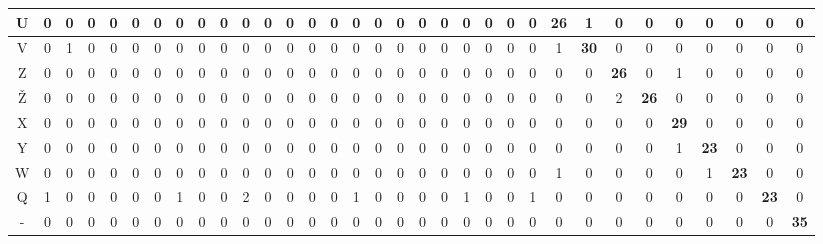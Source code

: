 \begin{table}[]
{\begin{tabular}{|c|c|c|c|c|c|c|c|c|c|c|c|c|c|c|c|c|c|c|c|c|c|c|c|c|c|c|c|c|c|c|c|c|}
U & 0 & 0 & 0 & 0 & 0 & 0 & 0 & 0 & 0 & 0 & 0 & 0 & 0 & 0 & 0 & 0 & 0 & 0 & 0 & 0 & 0 & 0 & 0 & \textbf{26} & 1 & 0 & 0 & 0 & 0 & 0 & 0 & 0 \\ \hline \rowcolor{gray1}
V & 0 & 1 & 0 & 0 & 0 & 0 & 0 & 0 & 0 & 0 & 0 & 0 & 0 & 0 & 0 & 0 & 0 & 0 & 0 & 0 & 0 & 0 & 0 & 1 & \textbf{30} & 0 & 0 & 0 & 0 & 0 & 0 & 0 \\ \hline \rowcolor{gray2} 
Z & 0 & 0 & 0 & 0 & 0 & 0 & 0 & 0 & 0 & 0 & 0 & 0 & 0 & 0 & 0 & 0 & 0 & 0 & 0 & 0 & 0 & 0 & 0 & 0 & 0 & \textbf{26} & 0 & 1 & 0 & 0 & 0 & 0 \\ \hline \rowcolor{gray1}
Ž & 0 & 0 & 0 & 0 & 0 & 0 & 0 & 0 & 0 & 0 & 0 & 0 & 0 & 0 & 0 & 0 & 0 & 0 & 0 & 0 & 0 & 0 & 0 & 0 & 0 & 2 & \textbf{26} & 0 & 0 & 0 & 0 & 0 \\ \hline \rowcolor{gray2} 
X & 0 & 0 & 0 & 0 & 0 & 0 & 0 & 0 & 0 & 0 & 0 & 0 & 0 & 0 & 0 & 0 & 0 & 0 & 0 & 0 & 0 & 0 & 0 & 0 & 0 & 0 & 0 & \textbf{29} & 0 & 0 & 0 & 0 \\ \hline \rowcolor{gray1}
Y & 0 & 0 & 0 & 0 & 0 & 0 & 0 & 0 & 0 & 0 & 0 & 0 & 0 & 0 & 0 & 0 & 0 & 0 & 0 & 0 & 0 & 0 & 0 & 0 & 0 & 0 & 0 & 1 & \textbf{23} & 0 & 0 & 0 \\ \hline \rowcolor{gray2} 
W & 0 & 0 & 0 & 0 & 0 & 0 & 0 & 0 & 0 & 0 & 0 & 0 & 0 & 0 & 0 & 0 & 0 & 0 & 0 & 0 & 0 & 0 & 0 & 1 & 0 & 0 & 0 & 0 & 1 & \textbf{23} & 0 & 0 \\ \hline \rowcolor{gray1}
Q & 1 & 0 & 0 & 0 & 0 & 0 & 1 & 0 & 0 & 2 & 0 & 0 & 0 & 0 & 1 & 0 & 0 & 0 & 0 & 1 & 0 & 0 & 1 & 0 & 0 & 0 & 0 & 0 & 0 & 0 & \textbf{23} & 0 \\ \hline \rowcolor{gray2} 
- & 0 & 0 & 0 & 0 & 0 & 0 & 0 & 0 & 0 & 0 & 0 & 0 & 0 & 0 & 0 & 0 & 0 & 0 & 0 & 0 & 0 & 0 & 0 & 0 & 0 & 0 & 0 & 0 & 0 & 0 & 0 & \textbf{35} \\ \hline
\end{tabular}
}
\end{table}
